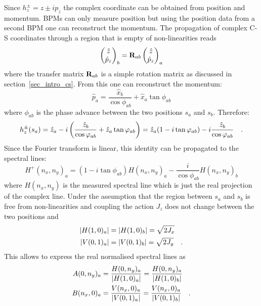 Since $h_z^\pm = z \pm ip_z$ the complex coordinate can be obtained from position and momentum.
BPMs can only measure position but using the position data from a second BPM one can reconstruct the momentum.
The propagation of complex C-S coordinates through a region that is empty of non-linearities reads
%
\begin{equation}
    \begin{pmatrix}
        \hat{z}\\ \hat{p}_z
    \end{pmatrix}_b = \mathbf{R}_{ab} 
    \begin{pmatrix}
        \hat{z}\\ \hat{p}_z
    \end{pmatrix}_a
\end{equation}
%
where the transfer matrix $\mathbf{R}_{ab}$ is a simple rotation matrix as discussed in section~\ref{sec_intro_cs}.
From this one can reconstruct the momentum:
%
\begin{equation}
    \hat{p}_a = \frac{\hat{x}_b}{\cos\phi_{ab}} + \hat{x}_a \tan\phi_{ab}
\end{equation}
%
where $\phi_{ab}$ is the phase advance between the two positions $s_a$ and $s_b$.
Therefore:
%
\begin{equation}
    h_z^\pm(s_a) = \hat{z}_a - i \left(\frac{\hat{z}_b}{\cos\varphi_{ab}} + \hat{z}_a\tan\varphi_{ab} \right) = \hat{z}_a(1-i\tan\varphi_{ab}) - i \frac{\hat{z}_b}{\cos\varphi_{ab}}
    \quad .
\end{equation}
%
Since the Fourier transform is linear, this identity can be propagated to the spectral lines:
%
\begin{equation}
    H^+(n_x,n_y)_a = (1-i\tan\phi_{ab})H(n_x,n_y)_a - \frac{i}{\cos\phi_{ab}}H(n_x,n_y)_b
    \label{eq_reconstr_cplx}
\end{equation}
where $H(n_x,n_y)$ is the measured spectral line which is just the real projection of the complex line. 
%
Under the assumption that the region between $s_a$ and $s_b$ is free from non-li\-nea\-ri\-ties and coupling
the action $J_z$ does not change between the two positions and
%
\begin{align}
    |H(1,0)_a| &= |H(1,0)_b| = \sqrt{2J_x} \notag\\
    |V(0,1)_a| &= |V(0,1)_b| = \sqrt{2J_y}
    \quad .
\end{align}
%
This allows to express the real normalised spectral lines as
%
\begin{align}
    A(0,n_y)_a &= \frac{H(0,n_y)_a}{\left| H(1,0)_a \right|} = \frac{H(0,n_y)_a}{\left| H(1,0)_b \right|} \notag \\
    B(n_x,0)_a &= \frac{V(n_x,0)_a}{\left| V(0,1)_a \right|} = \frac{V(n_x,0)_a}{\left| V(0,1)_b \right|} 
    \quad .
\end{align}
